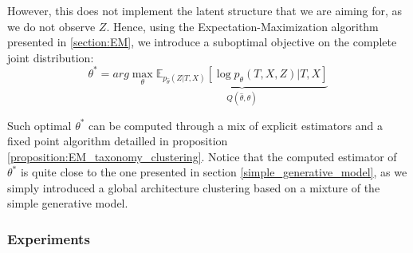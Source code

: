 However, this does not implement the latent structure that we are aiming for, as we do not observe $Z$.
Hence, using the Expectation-Maximization algorithm presented in \ref{section:EM}, we introduce a suboptimal objective on the
complete joint distribution:
$$
\theta^* = arg\max_{\theta} \underbrace{\mathbb{E}_{p_{\widehat{\theta}}(Z|T,X)}\left[ \log p_{\theta}(T, X, Z) | T, X \right]}_{Q(\widehat{\theta}, \theta)}
$$

Such optimal $\theta^*$ can be computed through a mix of explicit estimators and a fixed point algorithm detailled in proposition \ref{proposition:EM_taxonomy_clustering}.
Notice that the computed estimator of $\theta^*$ is quite close to the one presented in section \ref{simple_generative_model}, as we simply introduced a global architecture
clustering based on a mixture of the simple generative model.

\subsubsection{Experiments}
